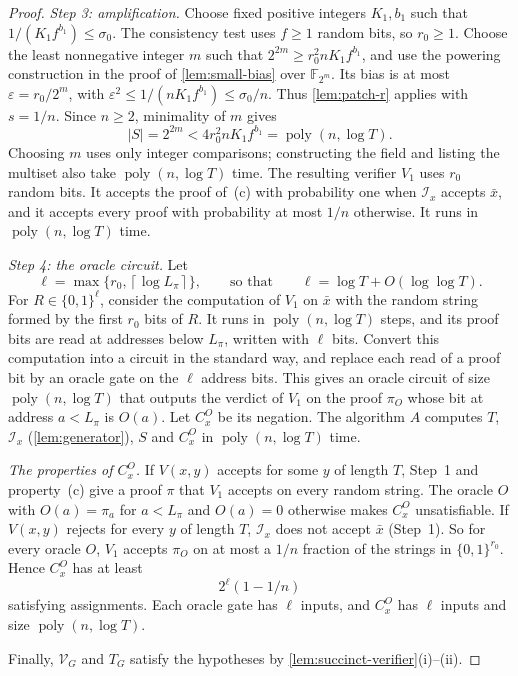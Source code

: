\documentclass[11pt,letterpaper]{article}
\theoremstyle{definition}
\theoremstyle{remark}
\newcommand{\poly}{\operatorname{poly}}
\newcommand{\ceil}[1]{\left\lceil #1\right\rceil}
\newcommand{\abs}[1]{\left|#1\right|}
\begin{document}
\begin{proof}
\emph{Step 3: amplification.} Choose fixed positive integers
\(K_1,b_1\) such that \(1/(K_1f^{b_1})\le\sigma_0\).
The consistency test uses \(f\ge1\) random bits, so \(r_0\ge1\).
Choose the least nonnegative integer \(m\) such that
\(2^{2m}\ge r_0^2nK_1f^{b_1}\), and use the powering construction
in the proof of \cref{lem:small-bias} over \(\mathbb F_{2^m}\).
Its bias is at most \(\varepsilon=r_0/2^m\), with
\(\varepsilon^2\le1/(nK_1f^{b_1})\le\sigma_0/n\).
Thus \cref{lem:patch-r} applies with \(s=1/n\). Since \(n\ge2\),
minimality of \(m\) gives
\[
 \abs S=2^{2m}<4r_0^2nK_1f^{b_1}=\poly(n,\log T).
\]
Choosing \(m\) uses only integer comparisons; constructing the field
and listing the multiset also take \(\poly(n,\log T)\) time.
The resulting verifier \(V_1\) uses \(r_0\) random bits. It accepts the
proof of~(c) with probability one when \(\mathcal I_x\) accepts
\(\bar x\), and it accepts every proof with
probability at most \(1/n\) otherwise. It runs in \(\poly(n,\log T)\)
time.

\emph{Step 4: the oracle circuit.} Let
\[
 \ell=\max\{r_0,\ceil{\log L_\pi}\},\qquad\text{so that}\qquad
 \ell=\log T+O(\log\log T).
\]
For \(R\in\{0,1\}^\ell\), consider the computation of \(V_1\) on
\(\bar x\) with the random string formed by the first \(r_0\) bits of
\(R\). It runs in \(\poly(n,\log T)\) steps, and its proof bits are read
at addresses below \(L_\pi\), written with \(\ell\) bits. Convert this
computation into a circuit in the standard way, and replace each read of
a proof bit by an oracle gate on the \(\ell\) address bits. This gives
an oracle circuit of size \(\poly(n,\log T)\) that outputs the verdict
of \(V_1\) on the proof \(\pi_O\) whose bit at address \(a<L_\pi\) is
\(O(a)\). Let \(C^O_x\) be its negation. The algorithm \(A\) computes
\(T\), \(\mathcal I_x\) (\cref{lem:generator}), \(S\) and \(C^O_x\) in
\(\poly(n,\log T)\) time.

\emph{The properties of \(C^O_x\).} If \(V(x,y)\) accepts for some \(y\)
of length \(T\), Step~1 and property~(c) give a proof \(\pi\) that
\(V_1\) accepts on every random string. The oracle \(O\) with
\(O(a)=\pi_a\) for \(a<L_\pi\) and \(O(a)=0\) otherwise makes \(C^O_x\)
unsatisfiable. If \(V(x,y)\) rejects for every \(y\) of length \(T\),
\(\mathcal I_x\) does not accept \(\bar x\) (Step~1). So for every
oracle \(O\), \(V_1\) accepts \(\pi_O\) on at most a \(1/n\) fraction of
the strings in \(\{0,1\}^{r_0}\). Hence \(C^O_x\) has at least
\[
 2^\ell(1-1/n)
\]
satisfying assignments. Each oracle gate has \(\ell\) inputs, and
\(C^O_x\) has \(\ell\) inputs and size \(\poly(n,\log T)\).

Finally, \(\mathcal V_G\) and \(T_G\) satisfy the hypotheses by
\cref{lem:succinct-verifier}(i)--(ii).
\end{proof}
\end{document}
